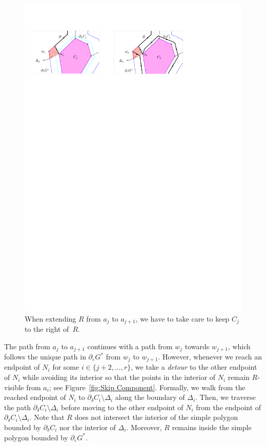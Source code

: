 \documentclass[11pt]{patmorin}
\begin{document}
\begin{figure}[tb]
\centering
\includegraphics{img/ComponentToTheRight.pdf}
\caption{When extending $R$ from $a_j$ to $a_{j+1}$, we have to take care to
    keep $C_j$ to the right of~$R$.}
\label{fig: Component to the right}
\end{figure}

The path from $a_j$ to $a_{j+1}$ continues with a path from $w_j$ towards $w_{j+1}$, which follows the unique path in $\partial_\varepsilon G^*$ from $w_j$ to $w_{j+1}$. However, whenever we reach an endpoint of $N_i$ for some $i\in \{j+2,\dots,r\}$, we take a \emph{detour} to the other endpoint of $N_i$ while avoiding its interior so that the points in the interior of $N_i$ remain $R$-visible from $a_i$; see Figure~\ref{fig:Skip Component}. Formally, we walk from the reached endpoint of $N_i$ to $\partial_\delta C_i\setminus \Delta_i$ along the boundary of $\Delta_i$. Then, we traverse the path $\partial_\delta C_i\setminus \Delta_i$ before moving to the other endpoint of $N_i$ from the endpoint of $\partial_\delta C_i \setminus \Delta_i$. Note that $R$ does not intersect the interior of the simple polygon bounded by $\partial_\delta C_i$ nor the interior of $\Delta_i$. Moreover, $R$ remains inside the simple polygon bounded by $\partial_\varepsilon G^*$.
\end{document}

